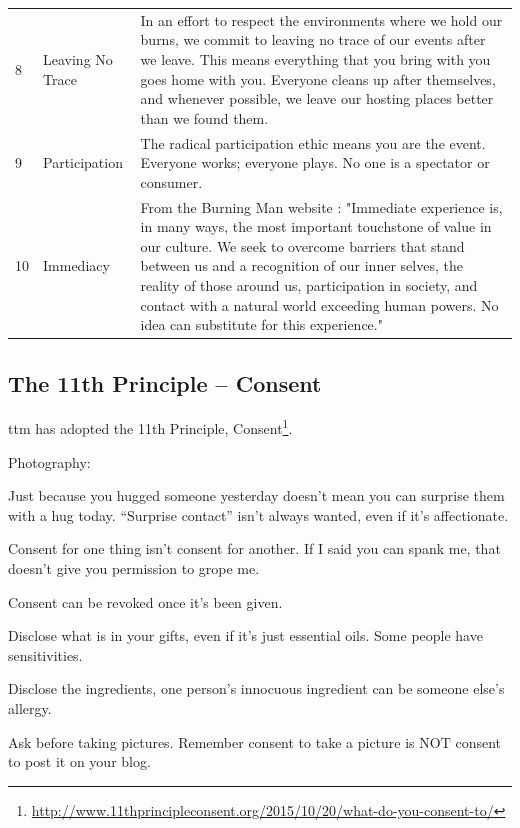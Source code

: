 \begin{table}[h!]
\begin{tabular}{@{}llp{4.3in}@{}}
8   & Leaving No Trace        & In an effort to respect the environments where we hold our burns, we commit to leaving no trace of our events after we leave. This means everything that you bring with you goes home with you. Everyone cleans up after themselves, and whenever possible, we leave our hosting places better than we found them.            \\[1em]
9   & Participation           & The radical participation ethic means you are the event. Everyone works; everyone plays. No one is a spectator or consumer.        \\[1em]
10  & Immediacy               & From the Burning Man website : "Immediate experience is, in many ways, the most important touchstone of value in our culture. We seek to overcome barriers that stand between us and a recognition of our inner selves, the reality of those around us, participation in society, and contact with a natural world exceeding human powers. No idea can substitute for this experience."             \\ \bottomrule
\end{tabular}
\end{table}
\vspace*{\fill}


\clearpage
\subsection*{The 11th Principle -- Consent}

\gls{ttm} has adopted the 11th Principle, Consent\footnote{\url{http://www.11thprincipleconsent.org/2015/10/20/what-do-you-consent-to/}}.

\begin{labeling}{Photography:}
	\item[Touch:] Just because you hugged someone yesterday doesn't mean you can surprise them with a hug today. ``Surprise contact'' isn't always wanted, even if it's affectionate.
	\item[Kink:] Consent for one thing isn't consent for another. If I said you can spank me, that doesn't give you permission to grope me.
	\item[Sex:] Consent can be revoked once it's been given.
	\item[Gifts:] Disclose what is in your gifts, even if it's just essential oils. Some people have sensitivities.
	\item[Foods:] Disclose the ingredients, one person's innocuous ingredient can be someone else's allergy.
	\item[Photography:] Ask before taking pictures. Remember consent to take a picture is NOT consent to post it on your blog.
\end{labeling}


